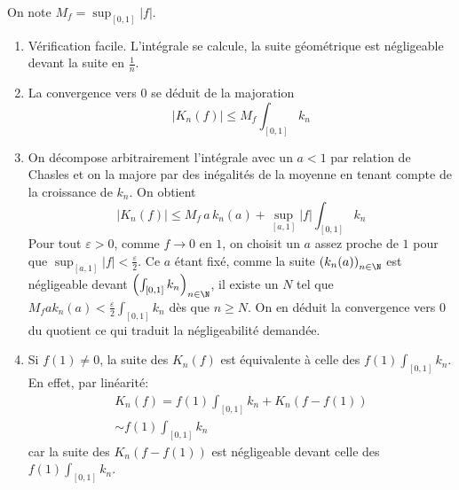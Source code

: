 On note $M_f= \sup_{[0,1]}|f|$.
\begin{enumerate}
 \item Vérification facile. L'intégrale se calcule, la suite géométrique est négligeable devant la suite en $\frac{1}{n}$.
 \item La convergence vers $0$ se déduit de la majoration 
\begin{displaymath}
 |K_n(f)|\leq M_f \int_{[0,1]}k_n
\end{displaymath}
 \item On décompose arbitrairement l'intégrale avec un $a<1$ par relation de Chasles et on la majore par des inégalités de la moyenne en tenant compte de la croissance de $k_n$. On obtient
\begin{displaymath}
 |K_n(f)|\leq M_f\, a\, k_n(a) + \sup_{[a,1]}|f|\int_{[0,1]}k_n
\end{displaymath}
Pour tout $\varepsilon >0$, comme $f\rightarrow 0$ en $1$, on choisit un $a$ assez proche de $1$  pour que $\sup_{[a,1]}|f|<\frac{\varepsilon}{2}$. Ce $a$ étant fixé, comme la suite $\left( k_n(a)\right) _{n\in \N}$ est négligeable devant $\left( \int_{[0,1]}k_n\right)_{n\in \N}$, il existe un $N$ tel que $M_fak_n(a)<\frac{\varepsilon}{2}\int_{[0,1]}k_n$ dès que $n\geq N$.\newline
On en déduit la convergence vers $0$ du quotient ce qui traduit la négligeabilité demandée.
 \item Si $f(1)\neq 0$, la suite des $K_n(f)$ est équivalente à celle des $f(1)\int_{[0,1]}k_n$.\newline
En effet, par linéarité:
\begin{multline*}
  K_n(f) = f(1)\int_{[0,1]}k_n + K_n(f-f(1))\\ \sim f(1)\int_{[0,1]}k_n
\end{multline*}
 car la suite des $K_n(f-f(1))$ est négligeable devant celle des $f(1)\int_{[0,1]}k_n$.
\end{enumerate}
